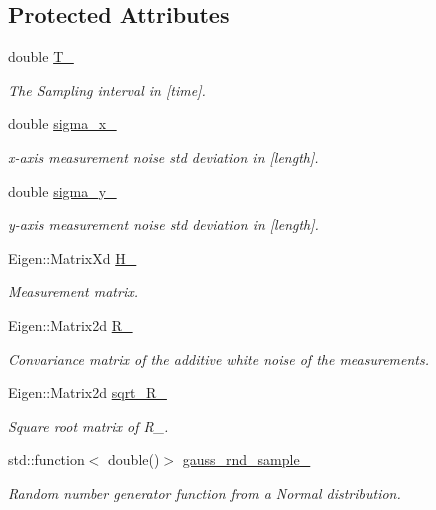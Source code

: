 \subsection*{Protected Attributes}
\begin{DoxyCompactItemize}
\item 
double \mbox{\hyperlink{classbfl_1_1LinearModel_a61e864670a689d32e6fc8be775f2ee86}{T\+\_\+}}
\begin{DoxyCompactList}\small\item\em The Sampling interval in \mbox{[}time\mbox{]}. \end{DoxyCompactList}\item 
double \mbox{\hyperlink{classbfl_1_1LinearModel_af6f8cd224c5e6e434dbba28032e8ecdd}{sigma\+\_\+x\+\_\+}}
\begin{DoxyCompactList}\small\item\em x-\/axis measurement noise std deviation in \mbox{[}length\mbox{]}. \end{DoxyCompactList}\item 
double \mbox{\hyperlink{classbfl_1_1LinearModel_a107c426bf4ec355672e778a1db137219}{sigma\+\_\+y\+\_\+}}
\begin{DoxyCompactList}\small\item\em y-\/axis measurement noise std deviation in \mbox{[}length\mbox{]}. \end{DoxyCompactList}\item 
Eigen\+::\+Matrix\+Xd \mbox{\hyperlink{classbfl_1_1LinearModel_a16918b937b83c701d78f713f529d1079}{H\+\_\+}}
\begin{DoxyCompactList}\small\item\em Measurement matrix. \end{DoxyCompactList}\item 
Eigen\+::\+Matrix2d \mbox{\hyperlink{classbfl_1_1LinearModel_afafae44b71487e16b19311f773a19db8}{R\+\_\+}}
\begin{DoxyCompactList}\small\item\em Convariance matrix of the additive white noise of the measurements. \end{DoxyCompactList}\item 
Eigen\+::\+Matrix2d \mbox{\hyperlink{classbfl_1_1LinearModel_abfb1e70c848b8c3406551b13b4926701}{sqrt\+\_\+\+R\+\_\+}}
\begin{DoxyCompactList}\small\item\em Square root matrix of R\+\_\+. \end{DoxyCompactList}\item 
std\+::function$<$ double()$>$ \mbox{\hyperlink{classbfl_1_1LinearModel_aa58a166ce01d56574fe0b3f4d41dea19}{gauss\+\_\+rnd\+\_\+sample\+\_\+}}
\begin{DoxyCompactList}\small\item\em Random number generator function from a Normal distribution. \end{DoxyCompactList}\end{DoxyCompactItemize}
